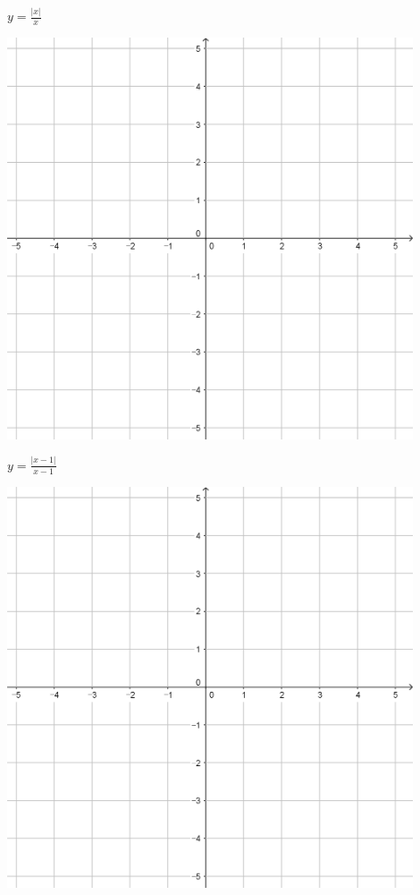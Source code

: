 \documentclass{oblivoir}
\begin{document}
\clearpage
\begin{minipage}{0.45\textwidth}\centering
\(y=\frac{|x|}{x}\)
\par\bigskip\includegraphics[width=0.9\textwidth]{55}
\end{minipage}
\begin{minipage}{0.45\textwidth}\centering
\(y=\frac{|x-1|}{x-1}\)
\par\bigskip\includegraphics[width=0.9\textwidth]{55}
\end{minipage}\bigskip\bigskip\par
\end{document}
